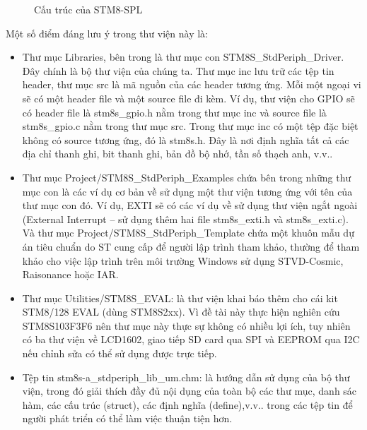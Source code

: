 \begin{figure}[!ht]
\caption{Cấu trúc của STM8-SPL}
\label{img:SPL_structure}
\end{figure}

\pagebreak
Một số điểm đáng lưu ý trong thư viện này là:
\begin{itemize}
\item Thư mục Libraries, bên trong là thư mục con STM8S\_StdPeriph\_Driver.
    Đây chính là bộ thư viện của chúng ta.
    Thư mục inc lưu trữ các tệp tin header, thư mục src là mã nguồn của các header tương ứng.
    Mỗi một ngoại vi sẽ có một header file và một source file đi kèm.
    Ví dụ, thư viện cho GPIO sẽ có header file là stm8s\_gpio.h nằm trong thư mục inc và source file là stm8s\_gpio.c nằm trong thư mục src.
    Trong thư mục inc có một tệp đặc biệt không có source tương ứng, đó là stm8s.h.
    Đây là nơi định nghĩa tất cả các địa chỉ thanh ghi, bit thanh ghi, bản đồ bộ nhớ, tần số thạch anh, v.v..
\item Thư mục Project/STM8S\_StdPeriph\_Examples chứa bên trong những thư mục con là các ví dụ cơ bản về sử dụng một thư viện tương ứng với tên của thư mục con đó.
    Ví dụ, EXTI sẽ có các ví dụ về sử dụng thư viện ngắt ngoài (External Interrupt – sử dụng thêm hai file stm8s\_exti.h và stm8s\_exti.c).
    Và thư mục Project/STM8S\_StdPeriph\_Template chứa một khuôn mẫu dự án tiêu chuẩn do ST cung cấp để người lập trình tham khảo, thường để tham khảo cho việc lập trình trên môi trường Windows sử dụng STVD-Cosmic, Raisonance hoặc IAR.
\item Thư mục Utilities/STM8S\_EVAL: là thư viện khai báo thêm cho cái kit STM8/128 EVAL (dùng STM8S2xx).
    Vì đề tài này thực hiện nghiên cứu STM8S103F3F6 nên thư mục này thực sự không có nhiều lợi ích, tuy nhiên có ba thư viện về LCD1602, giao tiếp SD card qua SPI và EEPROM qua I2C nếu chỉnh sửa có thể sử dụng được trực tiếp.
\item Tệp tin stm8s-a\_stdperiph\_lib\_um.chm: là hướng dẫn sử dụng của bộ thư viện, trong đó giải thích đầy đủ nội dụng của toàn bộ các thư mục, danh sác hàm, các cấu trúc (struct), các định nghĩa (define),v.v.. trong các tệp tin để người phát triển có thể làm việc thuận tiện hơn.
\end{itemize}

